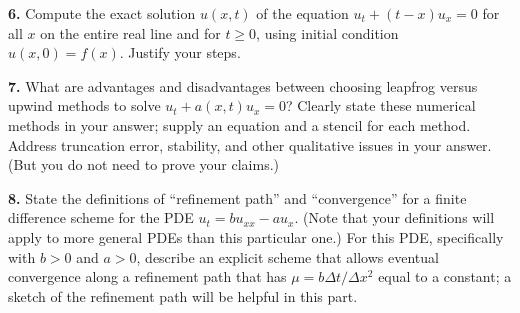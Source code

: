 \documentclass[11pt]{amsart}
\newcommand{\subheading}[1]{\medskip\noindent \textbf{#1.}\quad}
\begin{document}
\subheading{6}  Compute the exact solution $u(x,t)$ of the equation $u_t + (t-x) u_x = 0$ for all $x$ on the entire real line and for $t \ge 0$, using initial condition $u(x,0)=f(x)$.  Justify your steps.

\subheading{7}  What are advantages and disadvantages between choosing leapfrog versus upwind methods to solve $u_t + a(x,t) u_x = 0$?  Clearly state these numerical methods in your answer; supply an equation and a stencil for each method.  Address truncation error, stability, and other qualitative issues in your answer.  (But you do not need to prove your claims.)

\subheading{8}  State the definitions of ``refinement path'' and ``convergence'' for a finite difference scheme for the PDE $u_t = b u_{xx} - a u_x$.  (Note that your definitions will apply to more general PDEs than this particular one.)  For this PDE, specifically with $b>0$ and $a>0$, describe an explicit scheme that allows eventual convergence along a refinement path that has $\mu = b \Delta t/\Delta x^2$ equal to a constant; a sketch of the refinement path will be helpful in this part.
\end{document}
